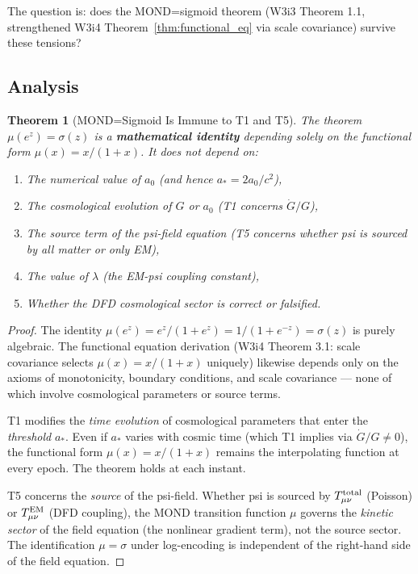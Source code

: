 \documentclass[11pt]{article}
\newtheorem{theorem}{Theorem}[section]
\theoremstyle{definition}
\theoremstyle{remark}
\newcommand{\astar}{a_*}
\newcommand{\mufn}{\mu}
\newcommand{\lam}{\lambda}
\begin{document}
The question is: does the MOND=sigmoid theorem (W3i3 Theorem 1.1,
strengthened W3i4 Theorem~\ref*{thm:functional_eq} via scale covariance)
survive these tensions?

\subsection{Analysis}

\begin{theorem}[MOND=Sigmoid Is Immune to T1 and T5]
\label{thm:mond_sigmoid_immune}
The theorem $\mufn(e^z) = \sigma(z)$ is a \textbf{mathematical identity}
depending solely on the functional form $\mufn(x) = x/(1+x)$. It does
not depend on:
\begin{enumerate}[label=(\roman*)]
\item The numerical value of $a_0$ (and hence $\astar = 2a_0/c^2$),
\item The cosmological evolution of $G$ or $a_0$ (T1 concerns $\dot{G}/G$),
\item The source term of the psi-field equation (T5 concerns whether
  psi is sourced by all matter or only EM),
\item The value of $\lam$ (the EM-psi coupling constant),
\item Whether the DFD cosmological sector is correct or falsified.
\end{enumerate}
\end{theorem}

\begin{proof}
The identity $\mufn(e^z) = e^z/(1+e^z) = 1/(1+e^{-z}) = \sigma(z)$ is
purely algebraic. The functional equation derivation
(W3i4 Theorem 3.1: scale covariance selects $\mufn(x) = x/(1+x)$
uniquely) likewise depends only on the axioms of monotonicity, boundary
conditions, and scale covariance --- none of which involve cosmological
parameters or source terms.

T1 modifies the \emph{time evolution} of cosmological parameters that
enter the \emph{threshold} $\astar$. Even if $\astar$ varies with cosmic
time (which T1 implies via $\dot{G}/G \neq 0$), the functional form
$\mufn(x) = x/(1+x)$ remains the interpolating function at every epoch.
The theorem holds at each instant.

T5 concerns the \emph{source} of the psi-field. Whether psi is sourced
by $T^{\rm total}_{\mu\nu}$ (Poisson) or $T^{\rm EM}_{\mu\nu}$ (DFD
coupling), the MOND transition function $\mufn$ governs the
\emph{kinetic sector} of the field equation (the nonlinear gradient
term), not the source sector. The identification $\mufn = \sigma$ under
log-encoding is independent of the right-hand side of the field equation.
\end{proof}
\end{document}
